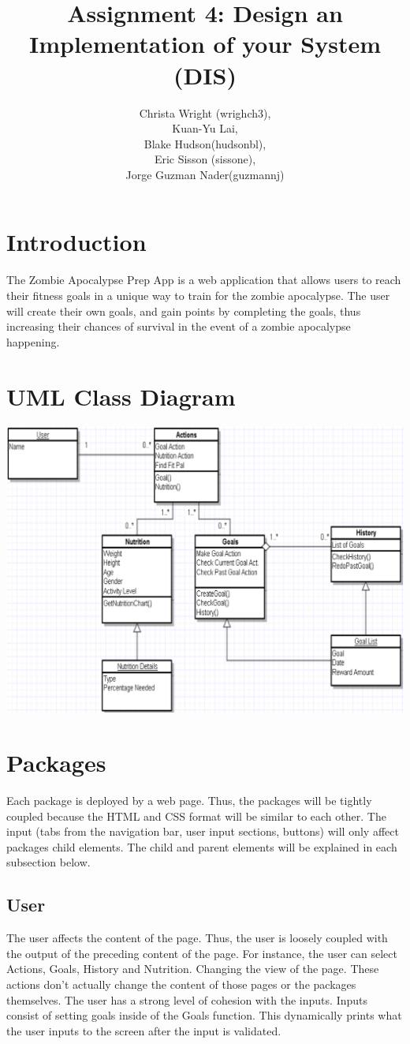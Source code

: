 \documentclass[a4paper]{article}
\title{Assignment 4: Design an Implementation of your System (DIS)}
\author{Christa Wright (wrighch3),\\ Kuan-Yu Lai,\\ Blake Hudson(hudsonbl), \\Eric Sisson (sissone), \\ Jorge Guzman Nader(guzmannj)}
\begin{document}
\maketitle
\tableofcontents
\pagebreak

\section{Introduction}

The Zombie Apocalypse Prep App is a web application that allows users to reach their fitness goals in a unique way to train for the zombie apocalypse. The user will create their own goals, and gain points by completing the goals, thus increasing their chances of survival in the event of a zombie apocalypse happening. 

\section{UML Class Diagram}
\includegraphics[width=\linewidth]{umldiagram.PNG}

\section{Packages}
Each package is deployed by a web page. Thus, the packages will be tightly coupled because the HTML and CSS format will be similar to each other. The input (tabs from the navigation bar, user input sections, buttons) will only affect packages child elements. The child and parent elements will be explained in each  subsection below.

\subsection{User}
The user affects the content of the page. Thus, the user is loosely coupled with the output of the preceding content of the page. For instance, the user can select Actions, Goals, History and Nutrition. Changing the view of the page. These actions don't actually change the content of those pages or the packages themselves. The user has a strong level of cohesion with the inputs. Inputs consist of setting goals inside of the Goals function. This dynamically prints what the user inputs to the screen after the input is validated.
\end{document}
